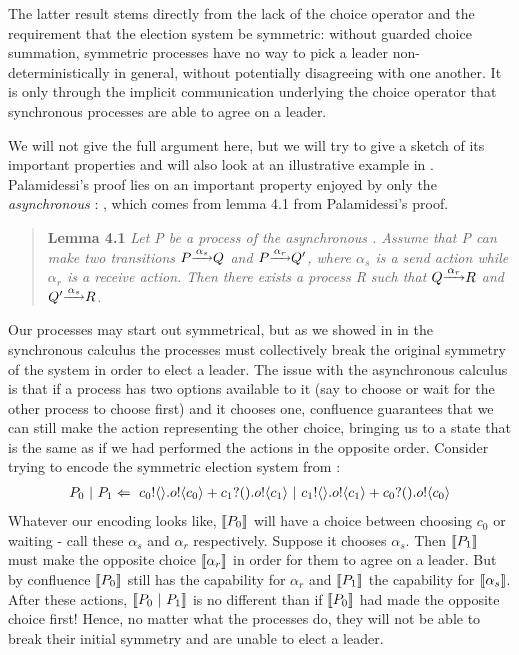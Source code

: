 The latter result stems directly from the lack of the choice operator and the requirement that the election system be symmetric: without guarded choice summation, symmetric processes have no way to pick a leader non-deterministically in general, without potentially disagreeing with one another.  
It is only through the implicit communication underlying the choice operator that synchronous processes are able to agree on a leader.

We will not give the full argument here, but we will try to give a sketch of its important properties and will also look at an illustrative example in .  
Palamidessi's proof lies on an important property enjoyed by only the \emph{asynchronous} \picalc:  , which comes from lemma 4.1 from Palamidessi's proof.
\begin{quote}
	\textsf{\textbf{Lemma 4.1}} \emph{Let P be a process of the asynchronous \picalc.  Assume that P can make two transitions $P \overset{\underrightarrow{\ {\alpha_s}\ }}{} Q$ and $P \overset{\underrightarrow{\ {\alpha_r}\ }}{} Q'$, where $\alpha_s$ is a send action while $\alpha_r$ is a receive action.  Then there exists a process R such that $Q \overset{\underrightarrow{\ {\alpha_r}\ }}{} R$ and $Q' \overset{\underrightarrow{\ {\alpha_s}\ }}{} R$.}
\end{quote}
Our processes may start out symmetrical, but as we showed in  in the synchronous calculus the processes must collectively break the original symmetry of the system in order to elect a leader.  
The issue with the asynchronous calculus is that if a process has two options available to it (say to choose or wait for the other process to choose first) and it chooses one, confluence guarantees that we can still make the action representing the other choice, bringing us to a state that is the same as if we had performed the actions in the opposite order.  
Consider trying to encode the symmetric election system from :
\begin{align}
	P_0\ |\  P_1 \Leftarrow\  {c_0}!\langle{}\rangle. {o}!\langle{c_0}\rangle + {c_1}?({}). {o}!\langle{c_1}\rangle \ |\  {c_1}!\langle{}\rangle. {o}!\langle{c_1}\rangle + {c_0}?({}). {o}!\langle{c_0}\rangle
	\label{leader_network_term2}	
\end{align}
Whatever our encoding looks like, $\llbracket{P_0}\rrbracket$ will have a choice between choosing $c_0$ or waiting - call these $\alpha_s$ and $\alpha_r$ respectively.  
Suppose it chooses $\alpha_s$.  
Then $\llbracket{P_1}\rrbracket$ must make the opposite choice $\llbracket{\alpha_r}\rrbracket$ in order for them to agree on a leader.  
But by confluence $\llbracket{P_0}\rrbracket$ still has the capability for $\alpha_r$ and $\llbracket{P_1}\rrbracket$ the capability for $\llbracket{\alpha_s}\rrbracket$.  
After these actions, $\llbracket{P_0  \ensuremath{\ |\ } P_1}\rrbracket$ is no different than if $\llbracket{P_0}\rrbracket$ had made the opposite choice first!  Hence, no matter what the processes do, they will not be able to break their initial symmetry and are unable to elect a leader.

